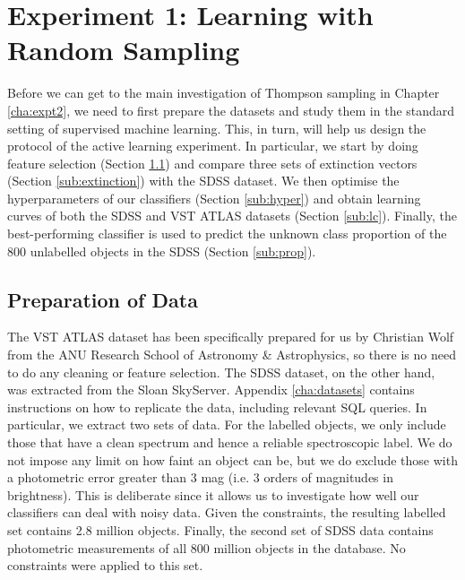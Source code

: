 
\chapter{Experiment 1: Learning with Random Sampling}
\label{cha:expt1}

Before we can get to the main investigation of Thompson sampling in Chapter \ref{cha:expt2}, we
need to first prepare the datasets and study them in the standard setting of supervised machine
learning. This, in turn, will help us design the protocol of the active learning experiment. In
particular, we start by doing feature selection (Section \ref{sec:prep}) and compare three sets of
extinction vectors (Section \ref{sub:extinction}) with the SDSS dataset. We then optimise the
hyperparameters of our classifiers (Section \ref{sub:hyper}) and obtain learning curves of both the
SDSS and VST ATLAS datasets (Section \ref{sub:lc}). Finally, the best-performing classifier is used
to predict the unknown class proportion of the 800 unlabelled objects in the SDSS (Section
\ref{sub:prop}).


\section{Preparation of Data}
\label{sec:prep}

The VST ATLAS dataset has been specifically prepared for us by Christian Wolf from the ANU Research
School of Astronomy \& Astrophysics, so there is no need to do any cleaning or feature selection.
The SDSS dataset, on the other hand, was extracted from the Sloan SkyServer. Appendix
\ref{cha:datasets} contains instructions on how to replicate the data, including relevant SQL
queries. In particular, we extract two sets of data. For the labelled objects, we only include
those that have a clean spectrum and hence a reliable spectroscopic label. We do not impose any
limit on how faint an object can be, but we do exclude those with a photometric error greater than
3 mag (i.e. 3 orders of magnitudes in brightness). This is deliberate since it allows us to
investigate how well our classifiers can deal with noisy data. Given the constraints, the resulting
labelled set contains 2.8 million objects. Finally, the second set of SDSS data contains
photometric measurements of all 800 million objects in the database. No constraints were applied to
this set.

